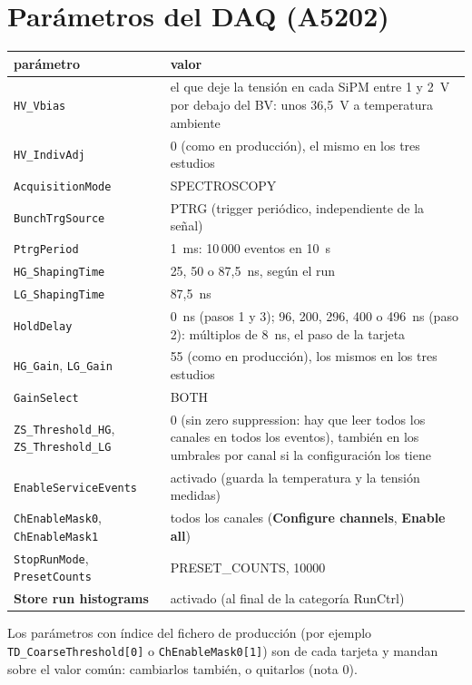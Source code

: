 \documentclass[11pt,a4paper]{article}
\begin{document}
\section{Parámetros del DAQ (A5202)}
\label{sec:janus}

\begin{center}
\small
\begin{tabular}{p{} p{}}
\hline
parámetro & valor \\
\hline
\texttt{HV\_Vbias} & el que deje la tensión en cada SiPM entre 1 y 2~V por
debajo del BV: unos 36,5~V a temperatura ambiente \\
\texttt{HV\_IndivAdj} & 0 (como en producción), el mismo en los tres
estudios \\
\texttt{AcquisitionMode} & SPECTROSCOPY \\
\texttt{BunchTrgSource} & PTRG (trigger periódico, independiente de la señal) \\
\texttt{PtrgPeriod} & 1~ms: 10\,000 eventos en 10~s \\
\texttt{HG\_ShapingTime} & 25, 50 o 87,5~ns, según el run \\
\texttt{LG\_ShapingTime} & 87,5~ns \\
\texttt{HoldDelay} & 0~ns (pasos 1 y 3); 96, 200, 296, 400 o 496~ns
(paso 2): múltiplos de 8~ns, el paso de la tarjeta \\
\texttt{HG\_Gain}, \texttt{LG\_Gain} & 55 (como en producción), los mismos
en los tres estudios \\
\texttt{GainSelect} & BOTH \\
\texttt{ZS\_Threshold\_HG}, \texttt{ZS\_Threshold\_LG} & 0 (sin zero
suppression: hay que leer todos los canales en todos los eventos), también
en los umbrales por canal si la configuración los tiene \\
\texttt{EnableServiceEvents} & activado (guarda la temperatura y la tensión
medidas) \\
\texttt{ChEnableMask0}, \texttt{ChEnableMask1} & todos los canales
({\bf Configure channels}, {\bf Enable all}) \\
\texttt{StopRunMode}, \texttt{PresetCounts} & PRESET\_COUNTS, 10000 \\
{\bf Store run histograms} & activado (al final de la categoría RunCtrl) \\
\hline
\end{tabular}
\end{center}

\noindent Los parámetros con índice del fichero de producción (por ejemplo
\texttt{TD\_CoarseThreshold[0]} o \texttt{ChEnableMask0[1]}) son de cada
tarjeta y mandan sobre el valor común: cambiarlos también, o quitarlos
(nota 0).
\end{document}
